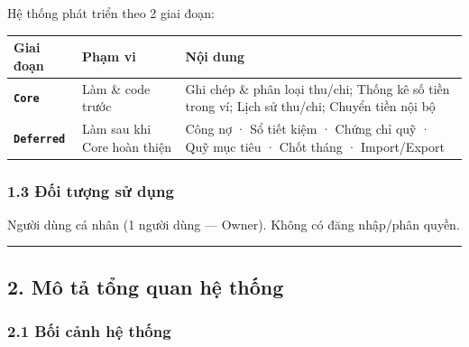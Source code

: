\documentclass[11pt,a4paper]{article}
\newcounter{none}
\begin{document}
Hệ thống phát triển theo 2 giai đoạn:

{\def\LTcaptype{none}
\begin{longtable}[]{@{}
  >{\raggedright\arraybackslash}p{}
  >{\raggedright\arraybackslash}p{}
  >{\raggedright\arraybackslash}p{}@{}}
\toprule\noalign{}
\begin{minipage}[b]{\linewidth}\raggedright
Giai đoạn
\end{minipage} & \begin{minipage}[b]{\linewidth}\raggedright
Phạm vi
\end{minipage} & \begin{minipage}[b]{\linewidth}\raggedright
Nội dung
\end{minipage} \\
\midrule\noalign{}
\endhead
\bottomrule\noalign{}
\endlastfoot
\textbf{\texttt{Core}} & Làm \& code trước & Ghi chép \& phân loại thu/chi; Thống kê số tiền trong ví; Lịch sử thu/chi; Chuyển tiền nội bộ \\ 
\textbf{\texttt{Deferred}} & Làm sau khi Core hoàn thiện & Công nợ · Sổ tiết kiệm · Chứng chỉ quỹ · Quỹ mục tiêu · Chốt tháng · Import/Export \\
\end{longtable}
}

\subsubsection{1.3 Đối tượng sử dụng}\label{ux111ux1ed1i-tux1b0ux1ee3ng-sux1eed-dux1ee5ng}

Người dùng cá nhân (1 người dùng --- Owner). Không có đăng nhập/phân quyền.

\begin{center}\rule{1.0\linewidth}{0.5pt}\end{center}

\newpage

\subsection{2. Mô tả tổng quan hệ thống}\label{muxf4-tux1ea3-tux1ed5ng-quan-hux1ec7-thux1ed1ng}

\subsubsection{2.1 Bối cảnh hệ thống}\label{bux1ed1i-cux1ea3nh-hux1ec7-thux1ed1ng}
\end{document}

